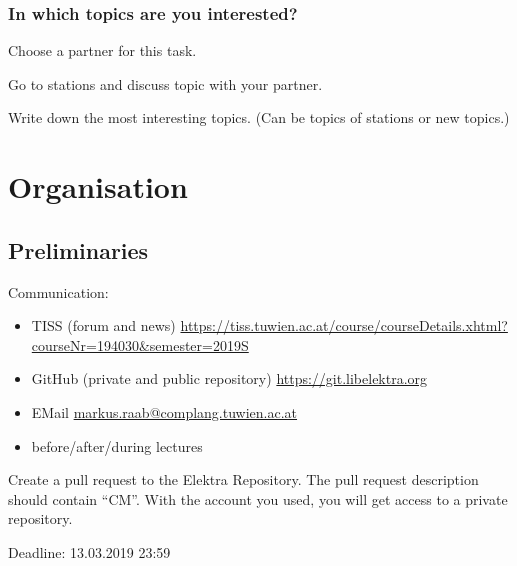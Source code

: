 \begin{assignment}
	\frametitle{In which topics are you interested?}
	\begin{task}[1]
	Choose a partner for this task.
	\end{task}

	\begin{task}[2]
	Go to stations and discuss topic with your partner.
	\end{task}

	\begin{task}[3]
	Write down the most interesting topics.
	(Can be topics of stations or new topics.)
	\end{task}
\end{assignment}





\section{Organisation}

\subsection{Preliminaries}
\begin{frame}
	Communication:
	\begin{itemize}
		\item TISS (forum and news) \url{https://tiss.tuwien.ac.at/course/courseDetails.xhtml?courseNr=194030&semester=2019S}
		\item GitHub (private and public repository) \url{https://git.libelektra.org}
		\item EMail \url{markus.raab@complang.tuwien.ac.at}
		\item before/after/during lectures
	\end{itemize}
\end{frame}

\begin{assignment}
	\begin{task}
	Create a pull request to the Elektra Repository.
	The pull request description should contain ``CM''.
	With the account you used, you will get access to a private repository.
	\end{task}
	Deadline: 13.03.2019 23:59
\end{assignment}

